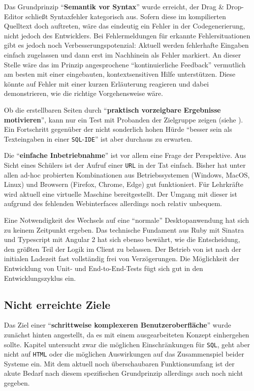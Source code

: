 Das Grundprinzip "`\textbf{Semantik vor Syntax}"' wurde erreicht, der Drag \& Drop-Editor schließt Syntaxfehler kategorisch aus. Sofern diese im kompilierten Quelltext doch auftreten, wäre das eindeutig ein Fehler in der Codegenerierung, nicht jedoch des Entwicklers. Bei Fehlermeldungen für erkannte Fehlersituationen gibt es jedoch noch Verbesserungspotenzial: Aktuell werden fehlerhafte Eingaben einfach zugelassen und dann erst im Nachhinein als Fehler markiert. An dieser Stelle wäre das im Prinzip angesprochene "`kontinuierliche Feedback"' vermutlich am besten mit einer eingebauten, kontextsensitiven Hilfe unterstützen. Diese könnte auf Fehler mit einer kurzen Erläuterung reagieren und dabei demonstrieren, wie die richtige Vorgehensweise wäre.

Ob die erstellbaren Seiten durch "`\textbf{praktisch vorzeigbare Ergebnisse motivieren}"', kann nur ein Test mit Probanden der Zielgruppe zeigen (siehe ). Ein Fortschritt gegenüber der nicht sonderlich hohen Hürde "`besser sein als Texteingaben in einer \texttt{SQL}-\texttt{IDE}"' ist aber durchaus zu erwarten.

Die "`\textbf{einfache Inbetriebnahme}"' ist vor allem eine Frage der Perspektive. Aus Sicht eines Schülers ist der Aufruf einer \texttt{URL} in der Tat einfach. Bisher hat \idename{} unter allen ad-hoc probierten Kombinationen aus Betriebssystemen (Windows, Mac\-OS, Linux) und Browsern (Firefox, Chrome, Edge) gut funktioniert. Für Lehrkräfte wird aktuell eine virtuelle Maschine bereitgestellt. Der Umgang mit dieser ist aufgrund des fehlenden Webinterfaces allerdings noch relativ unbequem.

Eine Notwendigkeit des Wechsels auf eine "`normale"' Desktopanwendung hat sich zu keinem Zeitpunkt ergeben. Das technische Fundament aus Ruby mit Sinatra und Typescript mit Angular 2 hat sich ebenso bewährt, wie die Entscheidung, den größten Teil der Logik im Client zu belassen. Der Betrieb von \idename{} ist nach der initialen Ladezeit fast vollständig frei von Verzögerungen. Die Möglichkeit der Entwicklung von Unit- und End-to-End-Tests fügt sich gut in den Entwicklungszyklus ein.

\subsection{Nicht erreichte Ziele}

Das Ziel einer "`\textbf{schrittweise komplexeren Benutzeroberfläche}"' wurde zunächst hinten angestellt, da es mit einem ausgearbeiteten Konzept einhergehen sollte. Kapitel  untersucht zwar die möglichen Einschränkungen für \texttt{SQL}, geht aber nicht auf \texttt{HTML} oder die möglichen Auswirkungen auf das Zusammenspiel beider Systeme ein. Mit dem aktuell noch überschaubaren Funktionsumfang ist der akute Bedarf nach diesem spezifischen Grundprinzip allerdings auch noch nicht gegeben.

